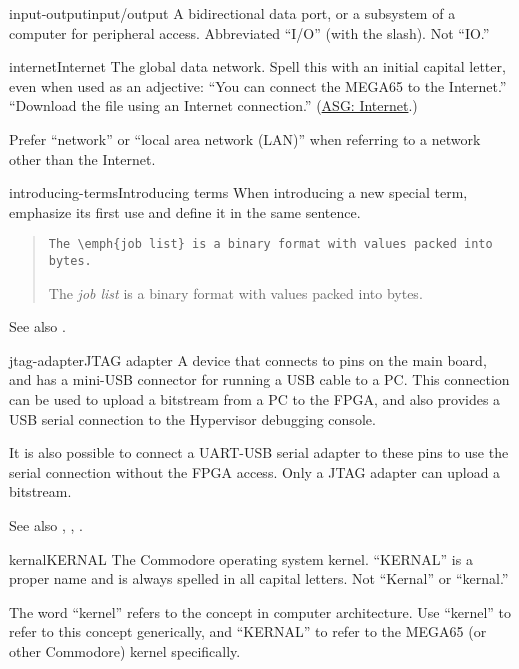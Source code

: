 \begin{sgentry}{input-output}{input/output}
    A bidirectional data port, or a subsystem of a computer for peripheral access. Abbreviated ``I/O'' (with the slash). Not ``IO.''
\end{sgentry}

\begin{sgentry}{internet}{Internet}
    The global data network. Spell this with an initial capital letter, even when used as an adjective: ``You can connect the MEGA65 to the Internet.'' ``Download the file using an Internet connection.'' (\href{https://support.apple.com/en-my/guide/applestyleguide/apsg346ef241/web}{ASG: Internet}.)

    Prefer ``network'' or ``local area network (LAN)'' when referring to a network other than the Internet.
\end{sgentry}

\begin{sgentry}{introducing-terms}{Introducing terms}
    When introducing a new special term, emphasize its first use and define it in the same sentence.

    \begin{quote}
        \texttt{The {\textbackslash}emph\{job list\} is a binary format with values packed into bytes.}

        \hrulefill

        The \emph{job list} is a binary format with values packed into bytes.
    \end{quote}

    See also .
\end{sgentry}

\begin{sgentry}{jtag-adapter}{JTAG adapter}
    A device that connects to pins on the main board, and has a mini-USB connector for running a USB cable to a PC. This connection can be used to upload a bitstream from a PC to the FPGA, and also provides a USB serial connection to the Hypervisor debugging console.

    It is also possible to connect a UART-USB serial adapter to these pins to use the serial connection without the FPGA access. Only a JTAG adapter can upload a bitstream.

    See also , , .
\end{sgentry}

\begin{sgentry}{kernal}{KERNAL}
    The Commodore operating system kernel. ``KERNAL'' is a proper name and is always spelled in all capital letters. Not ``Kernal'' or ``kernal.''

    The word ``kernel'' refers to the concept in computer architecture. Use ``kernel'' to refer to this concept generically, and ``KERNAL'' to refer to the MEGA65 (or other Commodore) kernel specifically.
\end{sgentry}

